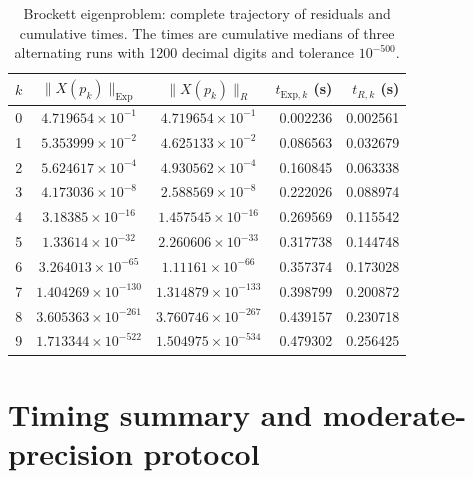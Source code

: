 \documentclass[11pt]{article}
\newcommand{\Exp}{\mathrm{Exp}}
\begin{document}
\begin{table}[H]
\centering
\scriptsize
\setlength{\tabcolsep}{4.2pt}
\begin{tabular}{rccrr}
\toprule
$k$ & $\|X(p_k)\|_{\Exp}$ & $\|X(p_k)\|_R$
& $t_{\Exp,k}$ (s) & $t_{R,k}$ (s)\\
\midrule
0 & $4.719654\times10^{-1}$ & $4.719654\times10^{-1}$ & 0.002236 & 0.002561 \\
1 & $5.353999\times10^{-2}$ & $4.625133\times10^{-2}$ & 0.086563 & 0.032679 \\
2 & $5.624617\times10^{-4}$ & $4.930562\times10^{-4}$ & 0.160845 & 0.063338 \\
3 & $4.173036\times10^{-8}$ & $2.588569\times10^{-8}$ & 0.222026 & 0.088974 \\
4 & $3.18385\times10^{-16}$ & $1.457545\times10^{-16}$ & 0.269569 & 0.115542 \\
5 & $1.33614\times10^{-32}$ & $2.260606\times10^{-33}$ & 0.317738 & 0.144748 \\
6 & $3.264013\times10^{-65}$ & $1.11161\times10^{-66}$ & 0.357374 & 0.173028 \\
7 & $1.404269\times10^{-130}$ & $1.314879\times10^{-133}$ & 0.398799 & 0.200872 \\
8 & $3.605363\times10^{-261}$ & $3.760746\times10^{-267}$ & 0.439157 & 0.230718 \\
9 & $1.713344\times10^{-522}$ & $1.504975\times10^{-534}$ & 0.479302 & 0.256425 \\
\bottomrule
\end{tabular}
\caption{Brockett eigenproblem: complete trajectory of residuals and cumulative times. The times are cumulative medians of three alternating runs with 1200 decimal digits and tolerance $10^{-500}$.}
\label{tab:supp_brockett}
\end{table}

\section{Timing summary and moderate-precision protocol}
\label{sec:supp_timing_summary}
\end{document}
